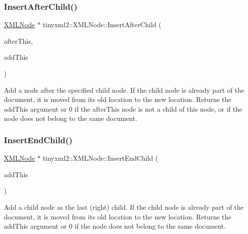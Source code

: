 \subsubsection{\texorpdfstring{Insert\+After\+Child()}{InsertAfterChild()}}
{\footnotesize\ttfamily \hyperlink{classtinyxml2_1_1_x_m_l_node}{X\+M\+L\+Node} $\ast$ tinyxml2\+::\+X\+M\+L\+Node\+::\+Insert\+After\+Child (\begin{DoxyParamCaption}\item[{\hyperlink{classtinyxml2_1_1_x_m_l_node}{X\+M\+L\+Node} $\ast$}]{after\+This,  }\item[{\hyperlink{classtinyxml2_1_1_x_m_l_node}{X\+M\+L\+Node} $\ast$}]{add\+This }\end{DoxyParamCaption})}

Add a node after the specified child node. If the child node is already part of the document, it is moved from its old location to the new location. Returns the add\+This argument or 0 if the after\+This node is not a child of this node, or if the node does not belong to the same document. \mbox{\label{classtinyxml2_1_1_x_m_l_node_ae3b422e98914d6002ca99bb1d2837103}} 
\subsubsection{\texorpdfstring{Insert\+End\+Child()}{InsertEndChild()}}
{\footnotesize\ttfamily \hyperlink{classtinyxml2_1_1_x_m_l_node}{X\+M\+L\+Node} $\ast$ tinyxml2\+::\+X\+M\+L\+Node\+::\+Insert\+End\+Child (\begin{DoxyParamCaption}\item[{\hyperlink{classtinyxml2_1_1_x_m_l_node}{X\+M\+L\+Node} $\ast$}]{add\+This }\end{DoxyParamCaption})}

Add a child node as the last (right) child. If the child node is already part of the document, it is moved from its old location to the new location. Returns the add\+This argument or 0 if the node does not belong to the same document. \mbox{\label{classtinyxml2_1_1_x_m_l_node_ac609a8f3ea949027f439280c640bbaf2}} 

